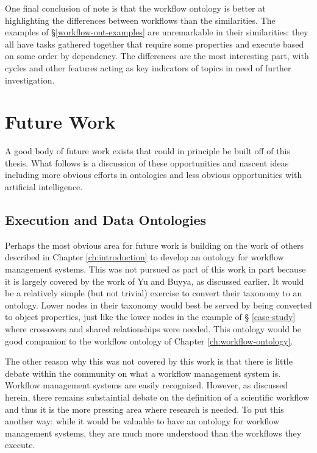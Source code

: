 One final conclusion of note is that the workflow ontology is better at
highlighting the differences between workflows than the similarities. The
examples of \S \ref{workflow-ont-examples} are unremarkable in their
similarities: they all have tasks gathered together that require some properties
and execute based on some order by dependency. The differences are the most
interesting part, with cycles and other features acting as key indicators of
topics in need of further investigation.

\section{Future Work}

A good body of future work exists that could in principle be built off of this
thesis. What follows is a discussion of these opportunities and nascent ideas
including more obvious efforts in ontologies and less obvious opportunities with
artificial intelligence.

\subsection{Execution and Data Ontologies}

Perhaps the most obvious area for future work is building on the work of others
described in Chapter \ref{ch:introduction} to develop an ontology for workflow
management systems. This was not pursued as part of this work in part because it
is largely covered by the work of Yu and Buyya, as discussed earlier. It would
be a relatively simple (but not trivial) exercise to convert their taxonomy to
an ontology. Lower nodes in their taxonomy would best be served by being
converted to object properties, just like the lower nodes in the example of \S
\ref{case-study} where crossovers and shared relationships were needed. This
ontology would be good companion to the workflow ontology of Chapter
\ref{ch:workflow-ontology}.

The other reason why this was not covered by this work is that there is little
debate within the community on what a workflow management system is. Workflow
management systems are easily recognized. However, as discussed herein, there
remains substaintial debate on the definition of a scientific workflow and thus
it is the more pressing area where research is needed. To put this another way:
while it would be valuable to have an ontology for workflow management systems,
they are much more understood than the workflows they execute.

